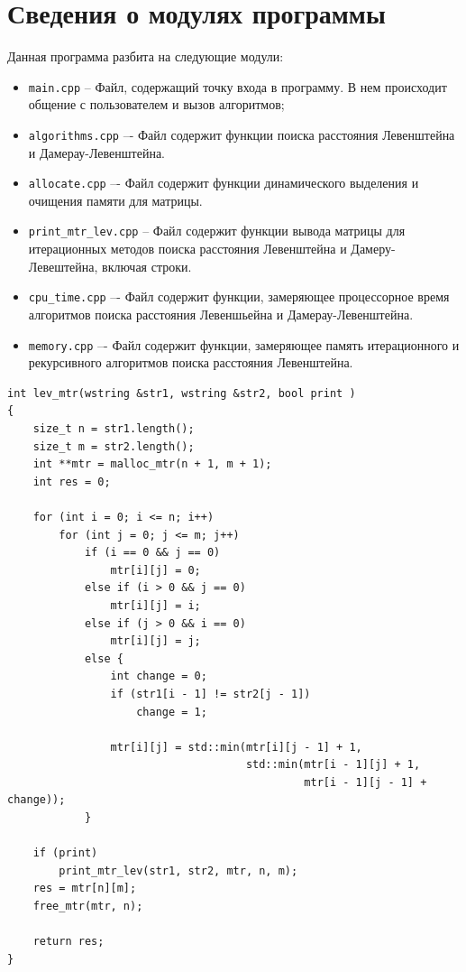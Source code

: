 \documentclass[a4paper,14pt, unknownkeysallowed]{bmstu}
\begin{document}
\section{Сведения о модулях программы}

Данная программа разбита на следующие модули:

\begin{itemize}
	\item \texttt{main.cpp} -- Файл, содержащий точку входа в программу. В нем происходит
общение с пользователем и вызов алгоритмов;
    \item \texttt{algorithms.cpp} –- Файл содержит функции поиска расстояния Левенштейна и Дамерау-Левенштейна.
    \item \texttt{allocate.cpp} –- Файл содержит функции динамического выделения и очищения памяти для матрицы.
    \item \texttt{print\_mtr\_lev.cpp} -- Файл содержит функции вывода матрицы для итерационных методов поиска расстояния Левенштейна и Дамеру-Левештейна, включая строки.
    \item \texttt{cpu\_time.cpp} –- Файл содержит функции, замеряющее процессорное время алгоритмов поиска расстояния Левеншьейна и Дамерау-Левенштейна.
    \item \texttt{memory.cpp} –- Файл содержит функции, замеряющее память итерационного и рекурсивного алгоритмов поиска расстояния Левенштейна.
\end{itemize}

\begin{lstlisting}[label=lst:lev_mtr,caption=Функция нахождения расстояния Левенштейна с использованием матрицы]
int lev_mtr(wstring &str1, wstring &str2, bool print )
{
    size_t n = str1.length();
    size_t m = str2.length();
    int **mtr = malloc_mtr(n + 1, m + 1);
    int res = 0;

    for (int i = 0; i <= n; i++)
        for (int j = 0; j <= m; j++)
            if (i == 0 && j == 0)
                mtr[i][j] = 0;
            else if (i > 0 && j == 0)
                mtr[i][j] = i;
            else if (j > 0 && i == 0)
                mtr[i][j] = j;
            else {
                int change = 0;
                if (str1[i - 1] != str2[j - 1])
                    change = 1;

                mtr[i][j] = std::min(mtr[i][j - 1] + 1,
                                     std::min(mtr[i - 1][j] + 1,
                                              mtr[i - 1][j - 1] + change));
            }

    if (print)
        print_mtr_lev(str1, str2, mtr, n, m);
    res = mtr[n][m];
    free_mtr(mtr, n);

    return res;
}
\end{lstlisting}
\end{document}
